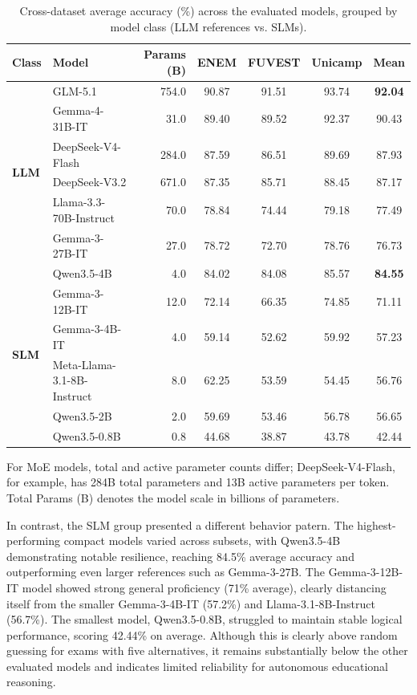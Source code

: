 \documentclass[12pt]{article}
\begin{document}
\begin{table}[htbp]
\caption{Cross-dataset average accuracy (\%) across the evaluated models, grouped by model class (LLM references vs. SLMs).}
\label{tab:accuracy}
\centering
\begin{tabular*}{\textwidth}{@{\extracolsep{\fill}} l l r c c c c}
\toprule
\textbf{Class} & \textbf{Model} & \textbf{Params (B)} & \textbf{ENEM} & \textbf{FUVEST} & \textbf{Unicamp} & \textbf{Mean} \\
\midrule
\multirow{6}{*}{\textbf{LLM}} 
& GLM-5.1 & 754.0 & 90.87 & 91.51 & 93.74 & \textbf{92.04} \\
& Gemma-4-31B-IT & 31.0 & 89.40 & 89.52 & 92.37 & 90.43 \\
& DeepSeek-V4-Flash & 284.0 & 87.59 & 86.51 & 89.69 & 87.93 \\
& DeepSeek-V3.2 & 671.0 & 87.35 & 85.71 & 88.45 & 87.17 \\
& Llama-3.3-70B-Instruct & 70.0 & 78.84 & 74.44 & 79.18 & 77.49 \\
& Gemma-3-27B-IT & 27.0 & 78.72 & 72.70 & 78.76 & 76.73 \\
\midrule
\multirow{6}{*}{\textbf{SLM}}
& Qwen3.5-4B & 4.0 & 84.02 & 84.08 & 85.57 & \textbf{84.55} \\
& Gemma-3-12B-IT & 12.0 & 72.14 & 66.35 & 74.85 & 71.11 \\
& Gemma-3-4B-IT & 4.0 & 59.14 & 52.62 & 59.92 & 57.23 \\
& Meta-Llama-3.1-8B-Instruct & 8.0 & 62.25 & 53.59 & 54.45 & 56.76 \\
& Qwen3.5-2B & 2.0 & 59.69 & 53.46 & 56.78 & 56.65 \\
& Qwen3.5-0.8B & 0.8 & 44.68 & 38.87 & 43.78 & 42.44 \\
\bottomrule
\end{tabular*}

\vspace{6pt}
\parbox{\textwidth}{\footnotesize \noindent For MoE models, total and active parameter counts differ; DeepSeek-V4-Flash, for example, has 284B total parameters and 13B active parameters per token. Total Params (B) denotes the model scale in billions of parameters.}
\end{table}

In contrast, the SLM group presented a different behavior patern. The highest-performing compact models varied across subsets, with Qwen3.5-4B demonstrating notable resilience, reaching 84.5\% average accuracy and outperforming even larger references such as Gemma-3-27B. The Gemma-3-12B-IT model showed strong general proficiency (71\% average), clearly distancing itself from the smaller Gemma-3-4B-IT (57.2\%) and Llama-3.1-8B-Instruct (56.7\%). The smallest model, Qwen3.5-0.8B, struggled to maintain stable logical performance, scoring 42.44\% on average. Although this is clearly above random guessing for exams with five alternatives, it remains substantially below the other evaluated models and indicates limited reliability for autonomous educational reasoning.
\end{document}
